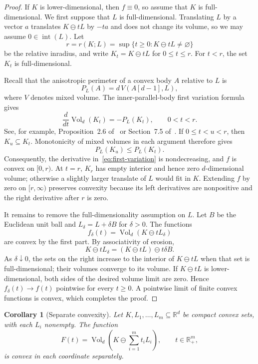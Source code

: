 \documentclass[11pt]{article}
\newtheorem{corollary}[theorem]{Corollary}
\theoremstyle{remark}
\newcommand{\R}{\mathbb{R}}
\newcommand{\Vol}{\operatorname{Vol}}
\newcommand{\MinkDiff}{\mathbin{\ominus}}
\begin{document}
\begin{proof}
If $K$ is lower-dimensional, then $f\equiv0$, so assume that $K$ is
full-dimensional.  We first suppose that $L$ is full-dimensional.
Translating $L$ by a vector $a$ translates
$K\MinkDiff tL$ by $-ta$ and does not change its volume, so we may
assume $0\in\operatorname{int}(L)$.  Let
\[
  r=r(K;L)=\sup\{t\geq0:K\MinkDiff tL\neq\varnothing\}
\]
be the relative inradius, and write $K_t=K\MinkDiff tL$ for
$0\leq t\leq r$.  For $t<r$, the set $K_t$ is full-dimensional.

Recall that the anisotropic perimeter of a convex body $A$ relative to
$L$ is
\[
  P_L(A)=d\,V(A[d-1],L),
\]
where $V$ denotes mixed volume.  The inner-parallel-body first
variation formula gives
\begin{equation}\label{eq:first-variation}
  \frac{d}{dt}\Vol_d(K_t)=-P_L(K_t),\qquad 0<t<r.
\end{equation}
See, for example, Proposition~2.6 of~\cite{RS22} or
Section~7.5 of~\cite{Schneider14}.  If $0\leq t<u<r$, then
$K_u\subseteq K_t$.  Monotonicity of mixed volumes in each argument
therefore gives
\[
  P_L(K_u)\leq P_L(K_t).
\]
Consequently, the derivative in~\eqref{eq:first-variation} is
nondecreasing, and $f$ is convex on $[0,r)$.  At $t=r$, $K_r$ has
empty interior and hence zero $d$-dimensional volume; otherwise a
slightly larger translate of $L$ would fit in $K$.  Extending $f$ by
zero on $[r,\infty)$ preserves convexity because its left derivatives
are nonpositive and the right derivative after $r$ is zero.

It remains to remove the full-dimensionality assumption on $L$.  Let
$B$ be the Euclidean unit ball and $L_\delta=L+\delta B$ for
$\delta>0$.  The functions
\[
  f_\delta(t)=\Vol_d(K\MinkDiff tL_\delta)
\]
are convex by the first part.  By associativity of erosion,
\begin{equation}\label{eq:regularized-erosion}
  K\MinkDiff tL_\delta
  =(K\MinkDiff tL)\MinkDiff t\delta B.
\end{equation}
As $\delta\downarrow0$, the sets on the right increase to the interior
of $K\MinkDiff tL$ when that set is full-dimensional; their volumes
converge to its volume.  If $K\MinkDiff tL$ is lower-dimensional, both
sides of the desired volume limit are zero.  Hence
$f_\delta(t)\to f(t)$ pointwise for every $t\geq0$.  A pointwise limit
of finite convex functions is convex, which completes the proof.
\end{proof}

\begin{corollary}[Separate convexity]\label{cor:separate-convex}
Let $K,L_1,\ldots,L_m\subseteq\R^d$ be compact convex sets, with each
$L_i$ nonempty.  The function
\[
  F(t)=\Vol_d\!\left(K\MinkDiff\sum_{i=1}^m t_iL_i\right),
  \qquad t\in\R_+^m,
\]
is convex in each coordinate separately.
\end{corollary}
\end{document}
